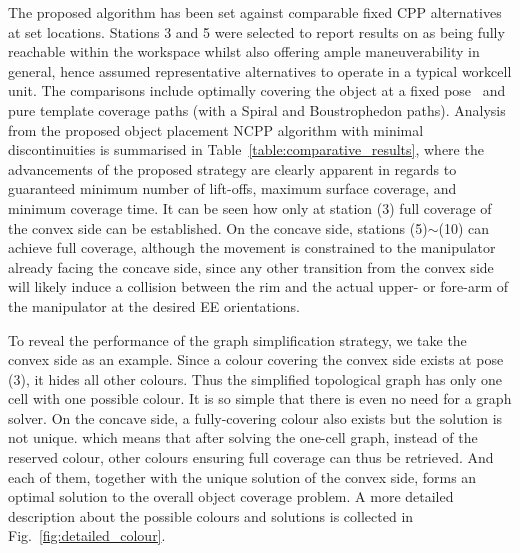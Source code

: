 \documentclass[letterpaper, 10pt, conference]{ieeeconf}
\begin{document}
The proposed algorithm has been set against comparable fixed CPP alternatives at set locations. Stations 3 and 5 were selected to report results on as being fully reachable within the workspace whilst also offering ample maneuverability in general, hence assumed representative alternatives to operate in a typical workcell unit. 
The comparisons include optimally covering the object at a fixed pose~\cite{Yang2020Cellular} and pure template coverage paths (with a Spiral and Boustrophedon paths). Analysis from the proposed object placement NCPP  algorithm with minimal discontinuities is summarised in Table~\ref{table:comparative_results}, where the advancements of the proposed strategy are clearly apparent in regards to guaranteed minimum number of lift-offs, maximum surface coverage, and minimum coverage time. 
It can be seen how only at station (3) full coverage of the convex side can be established. On the concave side, 
stations (5)$\sim$(10) can achieve full coverage, although the movement is constrained to the manipulator already facing the concave side, since any other transition from the convex side will likely induce a collision between the rim and the actual upper- or fore-arm of the manipulator at the desired EE orientations.


To reveal the performance of the graph simplification strategy, we take the convex side as an example. Since a colour covering the convex side exists at pose (3), it hides all other colours. Thus the simplified topological graph has only one cell with one possible colour. It is so simple that there is even no need for a graph solver. 
On the concave side, a fully-covering colour also exists but the solution is not unique. which means that after solving the one-cell graph, instead of the reserved colour, other colours ensuring full coverage can thus be retrieved. And each of them, together with the unique solution of the convex side, forms an optimal solution to the overall object coverage problem. A more detailed description about the possible colours and solutions is collected in Fig.~\ref{fig:detailed_colour}. 
\end{document}
